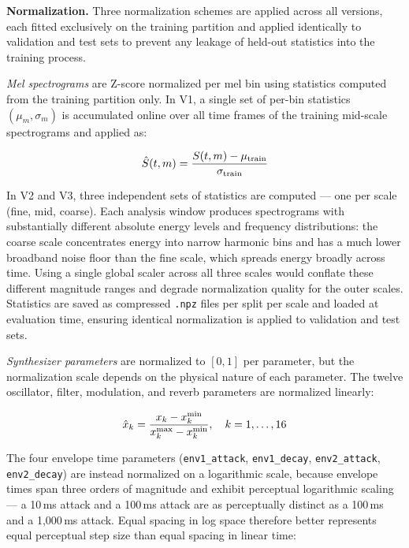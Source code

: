 \par \vspace{0.3cm}
\noindent\textbf{Normalization.} Three normalization schemes are applied across all versions, each fitted exclusively on the training partition and applied identically to validation and test sets to prevent any leakage of held-out statistics into the training process.

\par \vspace{0.3cm}
\textit{Mel spectrograms} are Z-score normalized per mel bin using statistics computed from the training partition only. In V1, a single set of per-bin statistics $(\mu_m, \sigma_m)$ is accumulated online over all time frames of the training mid-scale spectrograms and applied as:

\begin{equation}
\hat{S}(t, m) = \frac{S(t, m) - \mu_{\text{train}}}{\sigma_{\text{train}}}
\label{eq:zscore}\eqname{Mel spectrogram Z-score normalisation}
\end{equation}

\noindent In V2 and V3, three independent sets of statistics are computed --- one per scale (fine, mid, coarse). Each analysis window produces spectrograms with substantially different absolute energy levels and frequency distributions: the coarse scale concentrates energy into narrow harmonic bins and has a much lower broadband noise floor than the fine scale, which spreads energy broadly across time. Using a single global scaler across all three scales would conflate these different magnitude ranges and degrade normalization quality for the outer scales. Statistics are saved as compressed \texttt{.npz} files per split per scale and loaded at evaluation time, ensuring identical normalization is applied to validation and test sets.

\par \vspace{0.3cm}
\textit{Synthesizer parameters} are normalized to $[0, 1]$ per parameter, but the normalization scale depends on the physical nature of each parameter. The twelve oscillator, filter, modulation, and reverb parameters are normalized linearly:

\begin{equation}
\hat{x}_k = \frac{x_k - x_k^{\min}}{x_k^{\max} - x_k^{\min}}, \quad k = 1, \ldots, 16
\label{eq:minmax}\eqname{Parameter min-max normalisation}
\end{equation}

\noindent The four envelope time parameters (\texttt{env1\_attack}, \texttt{env1\_decay}, \texttt{env2\_attack}, \texttt{env2\_decay}) are instead normalized on a logarithmic scale, because envelope times span three orders of magnitude and exhibit perceptual logarithmic scaling --- a 10\,ms attack and a 100\,ms attack are as perceptually distinct as a 100\,ms and a 1{,}000\,ms attack. Equal spacing in log space therefore better represents equal perceptual step size than equal spacing in linear time:

